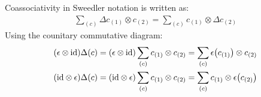\documentclass[svgnames]{article}
\theoremstyle{definition}
\newtheorem{Exercise}{Exercise}
\theoremstyle{remark}
\newtheorem*{Solution*}{Solution}
\theoremstyle{underline}
\theoremstyle{underline}
\newcommand{\id}{\mathrm{id}}
\begin{document}
	Coassociativity in Sweedler notation is written as:
	\begin{gather*}
		\sum_{(c)} \Delta c_{(1)} \otimes c_{(2)} = \sum_{(c)} c_{(1)} \otimes \Delta c_{(2)}
	\end{gather*}
	Using the counitary commutative diagram:
	\begin{gather*}
		\pqty{\epsilon \otimes \id}\Delta(c) = \pqty{\epsilon \otimes \id} \sum_{(c)} c_{(1)} \otimes c_{(2)} = \sum_{(c)} \epsilon\pqty{c_{(1)}} \otimes c_{(2)} \\
		\pqty{\id \otimes \epsilon}\Delta(c) = \pqty{\id \otimes \epsilon} \sum_{(c)} c_{(1)} \otimes c_{(2)} = \sum_{(c)} c_{(1)} \otimes \epsilon\pqty{c_{(2)}} 
	\end{gather*}

\end{document}
